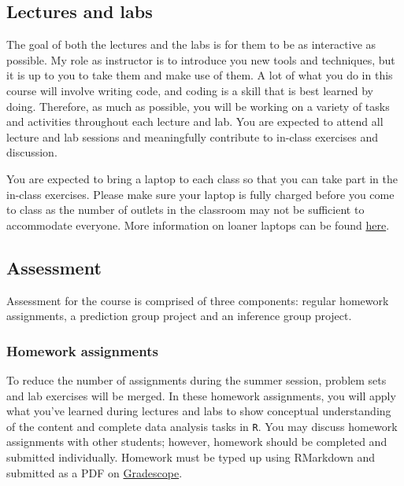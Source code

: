 \documentclass[
  letterpaper,
  DIV=11,
  numbers=noendperiod]{scrartcl}
\begin{document}
\hypertarget{lectures-and-labs}{%
\subsection{Lectures and labs}\label{lectures-and-labs}}

The goal of both the lectures and the labs is for them to be as
interactive as possible. My role as instructor is to introduce you new
tools and techniques, but it is up to you to take them and make use of
them. A lot of what you do in this course will involve writing code, and
coding is a skill that is best learned by doing. Therefore, as much as
possible, you will be working on a variety of tasks and activities
throughout each lecture and lab. You are expected to attend all lecture
and lab sessions and meaningfully contribute to in-class exercises and
discussion.

You are expected to bring a laptop to each class so that you can take
part in the in-class exercises. Please make sure your laptop is fully
charged before you come to class as the number of outlets in the
classroom may not be sufficient to accommodate everyone. More
information on loaner laptops can be found
\href{https://keeplearning.duke.edu/technical-support/}{here}.

\hypertarget{assessment}{%
\subsection{Assessment}\label{assessment}}

Assessment for the course is comprised of three components: regular
homework assignments, a prediction group project and an inference group
project.

\hypertarget{homework-assignments}{%
\subsubsection{Homework assignments}\label{homework-assignments}}

To reduce the number of assignments during the summer session, problem
sets and lab exercises will be merged. In these homework assignments,
you will apply what you've learned during lectures and labs to show
conceptual understanding of the content and complete data analysis tasks
in \texttt{R}. You may discuss homework assignments with other students;
however, homework should be completed and submitted individually.
Homework must be typed up using RMarkdown and submitted as a PDF on
\href{https://www.gradescope.com/courses/394638}{Gradescope}.
\end{document}
